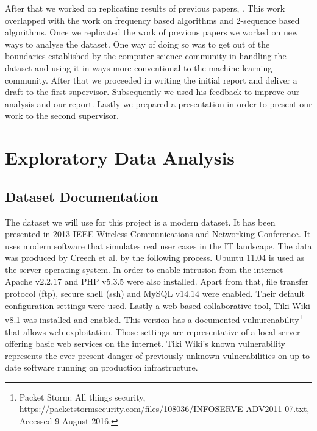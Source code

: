 \documentclass[reqno,openany,12pt]{amsbook}
\begin{document}
After that we worked on replicating results of previous papers\cite{adf1}, \cite{adf2}. This work overlapped with the work on frequency based algorithms and 2-sequence based algorithms. Once we replicated the work of previous papers we worked on new ways to analyse the dataset. One way of doing so was to get out of the boundaries established by the computer science community in handling the dataset and using it in ways more conventional to the machine learning community. After that we proceeded in writing the initial report and deliver a draft to the first supervisor. Subsequently we used his feedback to improve our analysis and our report. Lastly we prepared a presentation in order to present our work to the second supervisor.


\chapter{Exploratory Data Analysis}

\section{Dataset Documentation}

The dataset we will use for this project is a modern dataset. It has been presented in 2013 IEEE Wireless Communications and Networking Conference\cite{dat2}. It uses modern software that simulates real user cases in the IT landscape. The data was produced by Creech et al.\cite{dat2} by the following process. Ubuntu 11.04 is used as the server operating system. In order to enable intrusion from the internet Apache v$2.2.17$ and PHP v$5.3.5$ were also installed.  Apart from that, file transfer protocol (ftp), secure shell (ssh) and MySQL v$14.14$ were enabled. Their default configuration settings were used. Lastly a web based collaborative tool, Tiki Wiki v8.1 was installed and enabled. This version has a documented vulnurenability\footnote{Packet Storm: All things security, \url{https://packetstormsecurity.com/files/108036/INFOSERVE-ADV2011-07.txt}, Accessed 9 August 2016.} that allows web exploitation. Those settings are representative of a local server offering basic web services on the internet. Tiki Wiki's known vulnerability represents the ever present danger of previously unknown vulnerabilities on up to date software running on production infrastructure.
\end{document}
